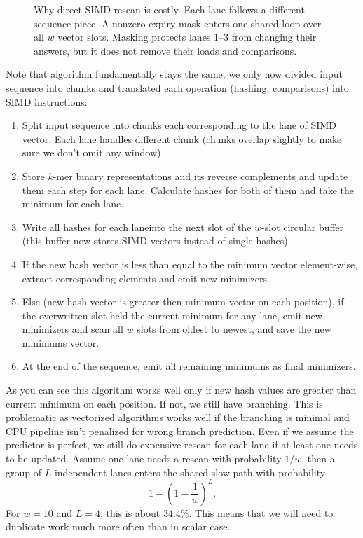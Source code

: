 \begin{figure}[H]
\begin{tikzpicture}
\end{tikzpicture}
\caption{Why direct SIMD rescan is costly. Each lane follows a different
sequence piece. A nonzero expiry mask enters one shared loop over all $w$
vector slots. Masking protects lanes 1--3 from changing their answers, but it
does not remove their loads and comparisons.}
\label{fig:rewrite-naive-simd-rescan}
\end{figure}

Note that algorithm fundamentally stays the same, we only now divided input sequence into chunks and translated each operation (hashing, comparisons) into SIMD instructions:

\begin{algorithm}[H]
\caption{SIMD minimap2-style rescan, with the output cases stated plainly}
\label{alg:simd-minimap-rescan}
\small
\begin{enumerate}
  \item Split input sequence into chunks each corresponding to the lane of SIMD vector. Each lane handles different chunk (chunks overlap slightly to make sure we don't omit any window)
  \item Store $k$-mer binary representations and its reverse complements and update them each step for each lane. Calculate hashes for both of them and take the minimum for each lane.
  \item Write all hashes for each laneinto the next slot of the $w$-slot circular buffer (this buffer now stores SIMD vectors instead of single hashes).
  \item If the new hash vector is less than equal to the minimum vector element-wise, extract corresponding elements and emit new minimizers.
  \item Else (new hash vector is greater then minimum vector on each position), if the overwritten slot held the current minimum for any lane, emit new minimizers and scan all $w$ slots from oldest to newest, and save the
        new minimums vector.
  \item At the end of the sequence, emit all remaining minimums as final minimizers.
\end{enumerate}
\end{algorithm}

As you can see this algorithm works well only if new hash values are greater than current minimum on each position. If not, we still have branching. This is problematic as vectorized algorithms works well if the branching is minimal and CPU pipeline isn't penalized for wrong branch prediction.
Even if we assume the predictor is perfect, we still do expensive rescan for each lane if at least one needs to be updated. Assume one lane needs a rescan with probability $1/w$, then a group of $L$
independent lanes enters the shared slow path with probability
\[
  1-\left(1-\frac1w\right)^L.
\]
For $w=10$ and $L=4$, this is about $34.4\%$. This means that we will need to duplicate work much more often than in scalar case.

